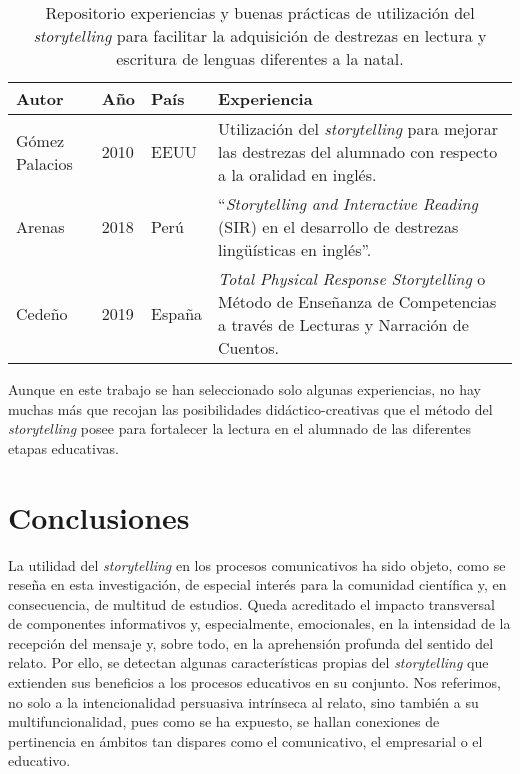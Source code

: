 \documentclass[spanish]{textolivre}
\begin{document}
\begin{table}[h!]
\begin{threeparttable}
\caption{Repositorio experiencias y buenas prácticas de utilización del \textit{storytelling} para facilitar la adquisición de destrezas en lectura y escritura de lenguas diferentes a la natal.}
\label{tab02}
\centering
\begin{tabular}{p{} p{1cm} p{2cm} p{7cm}}
\toprule 
\textbf{Autor} & \textbf{Año} & \textbf{País} & \textbf{Experiencia} \\
\midrule
Gómez Palacios & 2010 & EEUU & Utilización del \textit{storytelling} para mejorar las destrezas del alumnado con respecto a la oralidad en inglés. \\
Arenas & 2018 & Perú & “\textit{Storytelling and Interactive Reading} (SIR) en el desarrollo de destrezas lingüísticas en inglés”. \\
Cedeño & 2019 & España & \textit{Total Physical Response Storytelling} o Método de Enseñanza de Competencias a través de Lecturas y Narración de Cuentos. \\
\bottomrule
\end{tabular}
\end{threeparttable}
\end{table}

Aunque en este trabajo se han seleccionado solo algunas experiencias, no hay muchas más que recojan las posibilidades didáctico-creativas que el método del \textit{storytelling} posee para fortalecer la lectura en el alumnado de las diferentes etapas educativas.

\section{Conclusiones}\label{sec-idioma}
La utilidad del \textit{storytelling} en los procesos comunicativos ha sido objeto, como se reseña en esta investigación, de especial interés para la comunidad científica y, en consecuencia, de multitud de estudios. Queda acreditado el impacto transversal de componentes informativos y, especialmente, emocionales, en la intensidad de la recepción del mensaje y, sobre todo, en la aprehensión profunda del sentido del relato. Por ello, se detectan algunas características propias del \textit{storytelling} que extienden sus beneficios a los procesos educativos en su conjunto. Nos referimos, no solo a la intencionalidad persuasiva intrínseca al relato, sino también a su multifuncionalidad, pues como se ha expuesto, se hallan conexiones de pertinencia en ámbitos tan dispares como el comunicativo, el empresarial o el educativo. 
\end{document}
